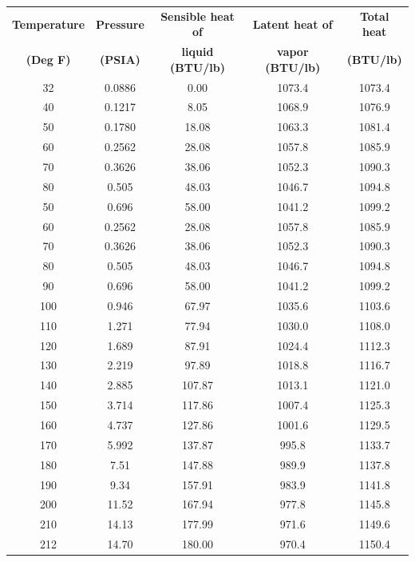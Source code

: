 \begin{center}
\begin{tabular}{| c | c | c | c | c |}
\hline 
\textbf{Temperature} & \textbf{Pressure} & \textbf{Sensible heat of} & \textbf{Latent heat of} & \textbf{Total heat} \\[3pt]
\textbf{(Deg F)} & \textbf{(PSIA)} & \textbf{liquid (BTU/lb)} & \textbf{vapor (BTU/lb)} & \textbf{(BTU/lb)} \\[3pt] \hline
32 & 0.0886 & 0.00 & 1073.4 & 1073.4 \\[3pt] \hline
40 & 0.1217 & 8.05 & 1068.9 & 1076.9 \\[3pt] \hline
50 & 0.1780 & 18.08 & 1063.3 & 1081.4 \\[3pt] \hline
60 & 0.2562 & 28.08 & 1057.8 & 1085.9 \\[3pt] \hline
70 & 0.3626 & 38.06 & 1052.3 & 1090.3 \\[3pt] \hline
80 & 0.505 & 48.03 & 1046.7 & 1094.8 \\[3pt] \hline
50 & 0.696 & 58.00 & 1041.2 & 1099.2 \\[3pt] \hline
60 & 0.2562 & 28.08 & 1057.8 & 1085.9 \\[3pt] \hline
70 & 0.3626 & 38.06 & 1052.3 & 1090.3 \\[3pt] \hline
80 & 0.505 & 48.03 & 1046.7 & 1094.8 \\[3pt] \hline
90 & 0.696 & 58.00 & 1041.2 & 1099.2 \\[3pt] \hline
100 & 0.946 & 67.97 & 1035.6 & 1103.6 \\[3pt] \hline
110 & 1.271 & 77.94 & 1030.0 & 1108.0 \\[3pt] \hline
120 & 1.689 & 87.91 & 1024.4 & 1112.3 \\[3pt] \hline
130 & 2.219 & 97.89 & 1018.8 & 1116.7 \\[3pt] \hline
140 & 2.885 & 107.87 & 1013.1 & 1121.0 \\[3pt] \hline
150 & 3.714 & 117.86 & 1007.4 & 1125.3 \\[3pt] \hline
160 & 4.737 & 127.86 & 1001.6 & 1129.5 \\[3pt] \hline
170 & 5.992 & 137.87 & 995.8 & 1133.7 \\[3pt] \hline
180 & 7.51 & 147.88 & 989.9 & 1137.8 \\[3pt] \hline
190 & 9.34 & 157.91 & 983.9 & 1141.8 \\[3pt] \hline
200 & 11.52 & 167.94 & 977.8 & 1145.8 \\[3pt] \hline
210 & 14.13 & 177.99 & 971.6 & 1149.6 \\[3pt] \hline
212 & 14.70 & 180.00 & 970.4 & 1150.4 \\[3pt] \hline
\end{tabular}
\end{center}

